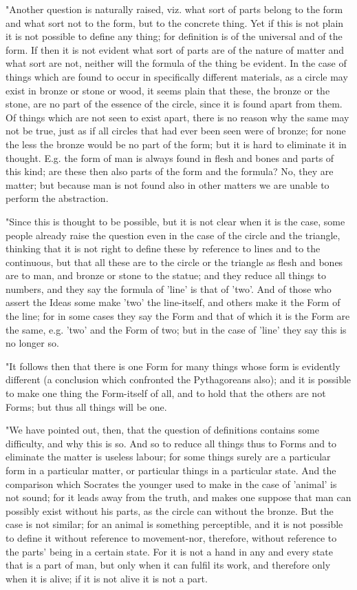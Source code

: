 "Another question is naturally raised, viz. what sort of parts belong
to the form and what sort not to the form, but to the concrete thing.
Yet if this is not plain it is not possible to define any thing; for
definition is of the universal and of the form. If then it is not
evident what sort of parts are of the nature of matter and what sort
are not, neither will the formula of the thing be evident. In the
case of things which are found to occur in specifically different
materials, as a circle may exist in bronze or stone or wood, it seems
plain that these, the bronze or the stone, are no part of the essence
of the circle, since it is found apart from them. Of things which
are not seen to exist apart, there is no reason why the same may not
be true, just as if all circles that had ever been seen were of bronze;
for none the less the bronze would be no part of the form; but it
is hard to eliminate it in thought. E.g. the form of man is always
found in flesh and bones and parts of this kind; are these then also
parts of the form and the formula? No, they are matter; but because
man is not found also in other matters we are unable to perform the
abstraction. 

"Since this is thought to be possible, but it is not clear when it
is the case, some people already raise the question even in the case
of the circle and the triangle, thinking that it is not right to define
these by reference to lines and to the continuous, but that all these
are to the circle or the triangle as flesh and bones are to man, and
bronze or stone to the statue; and they reduce all things to numbers,
and they say the formula of 'line' is that of 'two'. And of those
who assert the Ideas some make 'two' the line-itself, and others make
it the Form of the line; for in some cases they say the Form and that
of which it is the Form are the same, e.g. 'two' and the Form of two;
but in the case of 'line' they say this is no longer so.

"It follows then that there is one Form for many things whose form
is evidently different (a conclusion which confronted the Pythagoreans
also); and it is possible to make one thing the Form-itself of all,
and to hold that the others are not Forms; but thus all things will
be one. 

"We have pointed out, then, that the question of definitions contains
some difficulty, and why this is so. And so to reduce all things thus
to Forms and to eliminate the matter is useless labour; for some things
surely are a particular form in a particular matter, or particular
things in a particular state. And the comparison which Socrates the
younger used to make in the case of 'animal' is not sound; for it
leads away from the truth, and makes one suppose that man can possibly
exist without his parts, as the circle can without the bronze. But
the case is not similar; for an animal is something perceptible, and
it is not possible to define it without reference to movement-nor,
therefore, without reference to the parts' being in a certain state.
For it is not a hand in any and every state that is a part of man,
but only when it can fulfil its work, and therefore only when it is
alive; if it is not alive it is not a part. 


